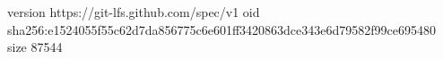 version https://git-lfs.github.com/spec/v1
oid sha256:e1524055f55c62d7da856775c6e601ff3420863dce343e6d79582f99ce695480
size 87544
